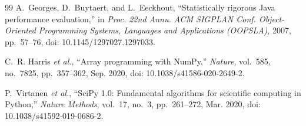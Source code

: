 \documentclass[11pt,a4paper]{article}
\begin{document}
\begin{thebibliography}{99}
A.~Georges, D.~Buytaert, and L.~Eeckhout, ``Statistically rigorous Java
performance evaluation,'' in \emph{Proc. 22nd Annu. ACM SIGPLAN Conf.
Object-Oriented Programming Systems, Languages and Applications (OOPSLA)},
2007, pp.~57--76, doi: 10.1145/1297027.1297033.

C.~R. Harris \emph{et al.}, ``Array programming with NumPy,'' \emph{Nature},
vol.~585, no.~7825, pp.~357--362, Sep. 2020, doi: 10.1038/s41586-020-2649-2.

P.~Virtanen \emph{et al.}, ``SciPy 1.0: Fundamental algorithms for scientific
computing in Python,'' \emph{Nature Methods}, vol.~17, no.~3, pp.~261--272,
Mar. 2020, doi: 10.1038/s41592-019-0686-2.

\end{thebibliography}
\end{document}
